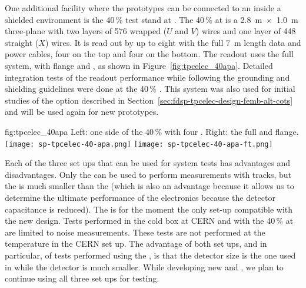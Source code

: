 One additional facility where the  prototypes can be connected to
an  inside a shielded environment is the \num{40}\,\%  
test stand at . The \num{40}\,\%  at  is a \SI{2.8}{m}~$\times$~\SI{1.0}{m} 
three-plane  with two layers of \num{576} wrapped ($U$ and $V$) wires 
and one layer of \num{448} straight ($X$) wires. It is read out by up to eight 
 with the full \SI{7}{m}  length data and  power 
cables, four on the top and four on the bottom. The readout uses the full  
system, with  flange and , as shown in Figure~\ref{fig:tpcelec_40apa}. 
Detailed integration tests of the   readout performance while 
following the  grounding and shielding guidelines were done at the \num{40}\,\% 
. This system was also used for initial studies of the  
option described in Section~\ref{sec:fdsp-tpcelec-design-femb-alt-cots} and will
be used again for new  prototypes.

\begin{dunefigure}
{fig:tpcelec_40apa}
{Left: one side of the \num{40}\,\%  with four .  Right: the full  \fdth and flange.}
\texttt{[image: sp-tpcelec-40-apa.png]}
\hspace{3mm}
\texttt{[image: sp-tpcelec-40-apa-ft.png]}
\end{dunefigure}

Each of the three set ups that can be used for system tests has advantages
and disadvantages. Only the   can be used to 
perform measurements with tracks, but the  is 
much smaller than the    (which is also an advantage because it
allows us to determine the ultimate performance of the electronics because
the detector capacitance is reduced). The  
is for the moment the only set-up compatible with the new 
design. Tests performed in the cold box at CERN and with the \num{40}\,\%  
at  are limited to noise measurements. These tests are not
performed at the  temperature in the CERN set up. The advantage of
both set ups, and in particular, of tests performed using the 
, is that the detector size is the one used in  while the  detector is
much smaller. While developing
new  and , we plan to continue using all
three set ups for testing.

